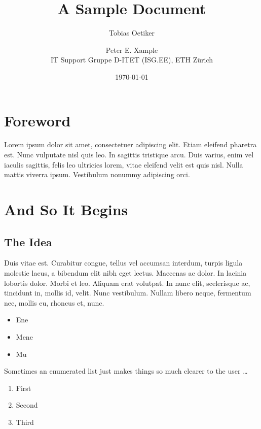 \documentclass[a4paper,12pt]{book}
\title{A Sample Document}
\date{\today}
\author{Tobias Oetiker\and Peter E. Xample\\
IT Support Gruppe D-ITET (ISG.EE), ETH Z\"urich}
\begin{document}
\maketitle

\frontmatter %

\chapter*{Foreword}
Lorem ipsum dolor sit amet, consectetuer
adipiscing elit. Etiam eleifend pharetra est. Nunc vulputate nisl quis
leo. In sagittis tristique arcu. Duis varius, enim vel iaculis
sagittis, felis leo ultricies lorem, vitae eleifend velit est quis
nisl. Nulla mattis viverra ipsum. Vestibulum nonummy
adipiscing orci.

\tableofcontents
\listoftables
\listoffigures

\mainmatter

\chapter{And So It Begins}


\section{The Idea}
Duis vitae est. Curabitur congue, tellus vel accumsan interdum, turpis
ligula molestie lacus, a bibendum elit nibh eget lectus. Maecenas ac
dolor. In lacinia lobortis dolor. Morbi et leo. Aliquam erat
volutpat. In nunc elit, scelerisque ac, tincidunt in, mollis id,
velit. Nunc vestibulum. Nullam libero neque, fermentum nec, mollis eu,
rhoncus et, nunc. 

\begin{itemize}
  \item Ene
  \item Mene
  \item Mu
\end{itemize}

Sometimes an enumerated list just makes things so much clearer to the user \ldots
\begin{enumerate}
  \item First
  \item Second
  \item Third
\end{enumerate}
\end{document}
